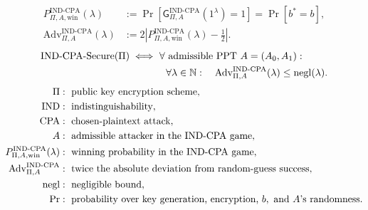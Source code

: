 \documentclass[12pt,a4paper]{article}
\begin{document}
\pagebreak[0]
\begin{samepage}
\begin{definition}
\[
\begin{aligned}
P_{\Pi,A,\mathrm{win}}^{\mathrm{IND\text{-}CPA}}(\lambda)
&:=\Pr\!\left[\mathsf{G}^{\mathrm{IND\text{-}CPA}}_{\Pi,A}(1^\lambda)=1\right]
=\Pr[b^*=b],\\
\mathrm{Adv}^{\mathrm{IND\text{-}CPA}}_{\Pi,A}(\lambda)
&:=2\left|P_{\Pi,A,\mathrm{win}}^{\mathrm{IND\text{-}CPA}}(\lambda)-\frac12\right|.
\end{aligned}
\]
\[
\begin{aligned}
\mathrm{IND\text{-}CPA\text{-}Secure}(\Pi)\iff
&\ \forall\text{ admissible PPT }A=(A_0,A_1):\\
&\quad\forall\lambda\in\mathbb{N}:\quad
\mathrm{Adv}^{\mathrm{IND\text{-}CPA}}_{\Pi,A}(\lambda)\leq\operatorname{negl}(\lambda).
\end{aligned}
\]
\[
\begin{aligned}
\Pi&:\text{ public key encryption scheme},\\
\mathrm{IND}&:\text{ indistinguishability},\\
\mathrm{CPA}&:\text{ chosen-plaintext attack},\\
A&:\text{ admissible attacker in the IND-CPA game},\\
P_{\Pi,A,\mathrm{win}}^{\mathrm{IND\text{-}CPA}}(\lambda)&:\text{ winning probability in the IND-CPA game},\\
\mathrm{Adv}^{\mathrm{IND\text{-}CPA}}_{\Pi,A}&:\text{ twice the absolute deviation from random-guess success},\\
\operatorname{negl}&:\text{ negligible bound},\\
\Pr&:\text{ probability over key generation, encryption, }b,
\text{ and }A\text{'s randomness}.
\end{aligned}
\]
\end{definition}

\end{samepage}
\end{document}
